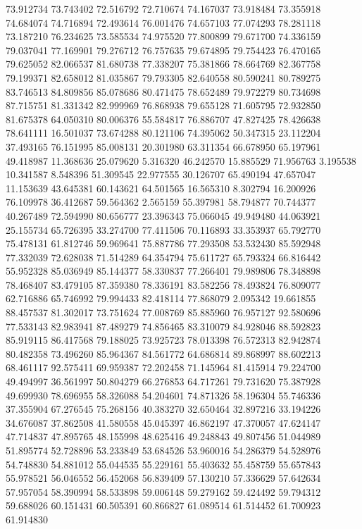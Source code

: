73.912734
73.743402
72.516792
72.710674
74.167037
73.918484
73.355918
74.684074
74.716894
72.493614
76.001476
74.657103
77.074293
78.281118
73.187210
76.234625
73.585534
74.975520
77.800899
79.671700
74.336159
79.037041
77.169901
79.276712
76.757635
79.674895
79.754423
76.470165
79.625052
82.066537
81.680738
77.338207
75.381866
78.664769
82.367758
79.199371
82.658012
81.035867
79.793305
82.640558
80.590241
80.789275
83.746513
84.809856
85.078686
80.471475
78.652489
79.972279
80.734698
87.715751
81.331342
82.999969
76.868938
79.655128
71.605795
72.932850
81.675378
64.050310
80.006376
55.584817
76.886707
47.827425
78.426638
78.641111
16.501037
73.674288
80.121106
74.395062
50.347315
23.112204
37.493165
76.151995
85.008131
20.301980
63.311354
66.678950
65.197961
49.418987
11.368636
25.079620
5.316320
46.242570
15.885529
71.956763
3.195538
10.341587
8.548396
51.309545
22.977555
30.126707
65.490194
47.657047
11.153639
43.645381
60.143621
64.501565
16.565310
8.302794
16.200926
76.109978
36.412687
59.564362
2.565159
55.397981
58.794877
70.744377
40.267489
72.594990
80.656777
23.396343
75.066045
49.949480
44.063921
25.155734
65.726395
33.274700
77.411506
70.116893
33.353937
65.792770
75.478131
61.812746
59.969641
75.887786
77.293508
53.532430
85.592948
77.332039
72.628038
71.514289
64.354794
75.611727
65.793324
66.816442
55.952328
85.036949
85.144377
58.330837
77.266401
79.989806
78.348898
78.468407
83.479105
87.359380
78.336191
83.582256
78.493824
76.809077
62.716886
65.746992
79.994433
82.418114
77.868079
2.095342
19.661855
88.457537
81.302017
73.751624
77.008769
85.885960
76.957127
92.580696
77.533143
82.983941
87.489279
74.856465
83.310079
84.928046
88.592823
85.919115
86.417568
79.188025
73.925723
78.013398
76.572313
82.942874
80.482358
73.496260
85.964367
84.561772
64.686814
89.868997
88.602213
68.461117
92.575411
69.959387
72.202458
71.145964
81.415914
79.224700
49.494997
36.561997
50.804279
66.276853
64.717261
79.731620
75.387928
49.699930
78.696955
58.326088
54.204601
74.871326
58.196304
55.746336
37.355904
67.276545
75.268156
40.383270
32.650464
32.897216
33.194226
34.676087
37.862508
41.580558
45.045397
46.862197
47.370057
47.624147
47.714837
47.895765
48.155998
48.625416
49.248843
49.807456
51.044989
51.895774
52.728896
53.233849
53.684526
53.960016
54.286379
54.528976
54.748830
54.881012
55.044535
55.229161
55.403632
55.458759
55.657843
55.978521
56.046552
56.452068
56.839409
57.130210
57.336629
57.642634
57.957054
58.390994
58.533898
59.006148
59.279162
59.424492
59.794312
59.688026
60.151431
60.505391
60.866827
61.089514
61.514452
61.700923
61.914830
